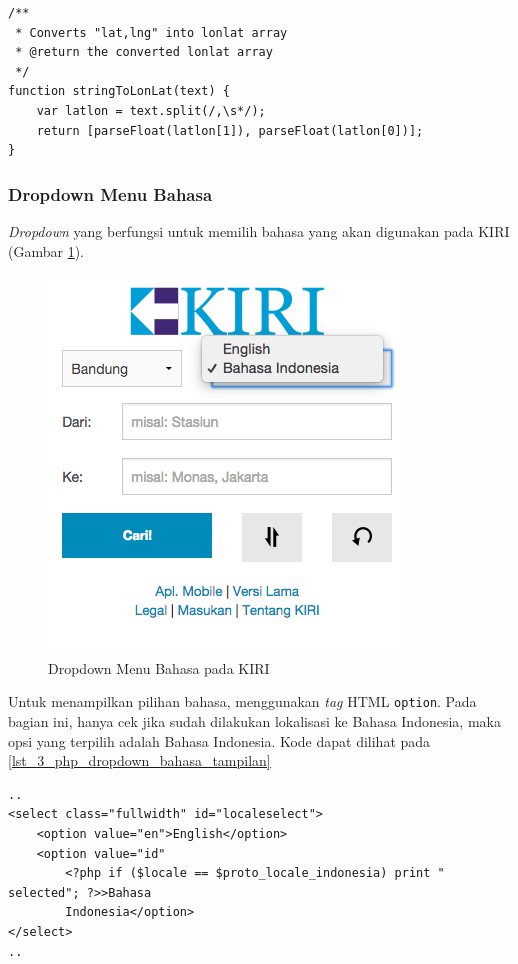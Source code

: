 \begin{lstlisting}[caption=Fungsi JavaScript untuk mengubah String menjadi \textit{array} Float ,label = {lst_3_php_dropdown_kota_parse}]
/**
 * Converts "lat,lng" into lonlat array
 * @return the converted lonlat array
 */
function stringToLonLat(text) {
	var latlon = text.split(/,\s*/);
	return [parseFloat(latlon[1]), parseFloat(latlon[0])];
}
\end{lstlisting}

\subsubsection{Dropdown Menu Bahasa}
\textit{Dropdown} yang berfungsi untuk memilih bahasa yang akan digunakan pada KIRI (Gambar \ref{fig:3_KIRI_drop_bahasa}).

\begin{figure}[H]
	\centering
	\includegraphics[scale=0.5]{Gambar/KIRI-drop-bahasa}
	\caption{Dropdown Menu Bahasa pada KIRI} 
	\label{fig:3_KIRI_drop_bahasa}
\end{figure}

Untuk menampilkan pilihan bahasa, menggunakan \textit{tag} HTML \verb!option!. Pada bagian ini, hanya cek jika sudah dilakukan lokalisasi ke Bahasa Indonesia, maka opsi yang terpilih adalah Bahasa Indonesia. Kode dapat dilihat pada \ref{lst_3_php_dropdown_bahasa_tampilan}

\begin{lstlisting}[caption=Menampilkan pilihan bahasa kepada pengguna ,label = {lst_3_php_dropdown_bahasa_tampilan}]
..
<select class="fullwidth" id="localeselect">
	<option value="en">English</option>
	<option value="id"
		<?php if ($locale == $proto_locale_indonesia) print " selected"; ?>>Bahasa
		Indonesia</option>
</select>
..
\end{lstlisting}

